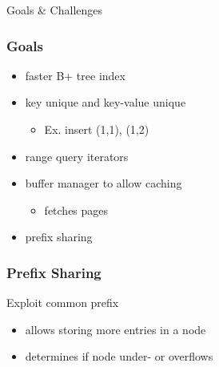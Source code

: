 \documentclass{beamer}
\begin{document}
  \begin{section}{Goals \& Challenges}
    \begin{frame}
      \frametitle{Goals}
        \begin{itemize}
          \item faster B+ tree index
          \pause
          \item key unique and key-value unique
          \begin{itemize}
            \item Ex. insert (1,1), (1,2)
          \end{itemize}
          \pause
          \item range query iterators
          \pause
          \item buffer manager to allow caching
          \begin{itemize}
            \item fetches pages 
          \end{itemize}
          \pause
          \item prefix sharing
        \end{itemize}
    \end{frame}

    \begin{frame}
      \frametitle{Prefix Sharing}
      \begin{block} {Exploit common prefix}
      \hspace*{\fill}
      \pause
      \hspace*{\fill}
      \end{block}
      \pause
      \pause
        \begin{itemize}
            \item allows storing more entries in a node
            \item determines if node under- or overflows
        \end{itemize}    
    \end{frame}


\end{section}
\end{document}
